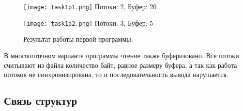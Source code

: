 \clearpage

\begin{figure}[h]
    \centering
    \hspace*{\fill}
    \begin{minipage}{0.4\textwidth}
        \centering
        \texttt{[image: task1p1.png]}
        Потоки: 2, Буфер: 20
    \end{minipage}
    \hfill
    \begin{minipage}{0.49\textwidth}
        \centering
        \texttt{[image: task1p2.png]}
        Потоки: 3, Буфер: 5
    \end{minipage}
    \hspace*{\fill}
    \caption{Результат работы первой программы.}
\end{figure}

В многопоточном варианте программы чтение также буферизовано. Все потоки
считывают из файла количество байт, равное размеру буфера, а так как работа
потоков не синхронизирована, то и последовательность вывода нарушается.

\clearpage

\subsection{Связь структур}

\vspace*{\fill}
\begin{figure}[h]
    \centering
    \def\svgwidth{\textwidth}
    
\end{figure}
\vfill

